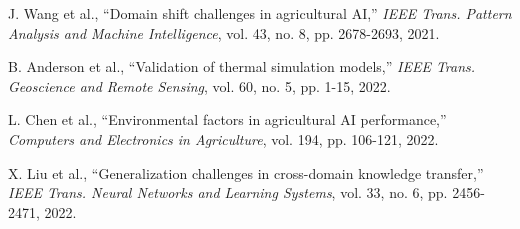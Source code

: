 \documentclass[conference]{IEEEtran}
\begin{document}
\begin{thebibliography}{00}
J. Wang et al., ``Domain shift challenges in agricultural AI,'' \textit{IEEE Trans. Pattern Analysis and Machine Intelligence}, vol. 43, no. 8, pp. 2678-2693, 2021.

B. Anderson et al., ``Validation of thermal simulation models,'' \textit{IEEE Trans. Geoscience and Remote Sensing}, vol. 60, no. 5, pp. 1-15, 2022.

L. Chen et al., ``Environmental factors in agricultural AI performance,'' \textit{Computers and Electronics in Agriculture}, vol. 194, pp. 106-121, 2022.

X. Liu et al., ``Generalization challenges in cross-domain knowledge transfer,'' \textit{IEEE Trans. Neural Networks and Learning Systems}, vol. 33, no. 6, pp. 2456-2471, 2022.

\end{thebibliography}
\end{document}
